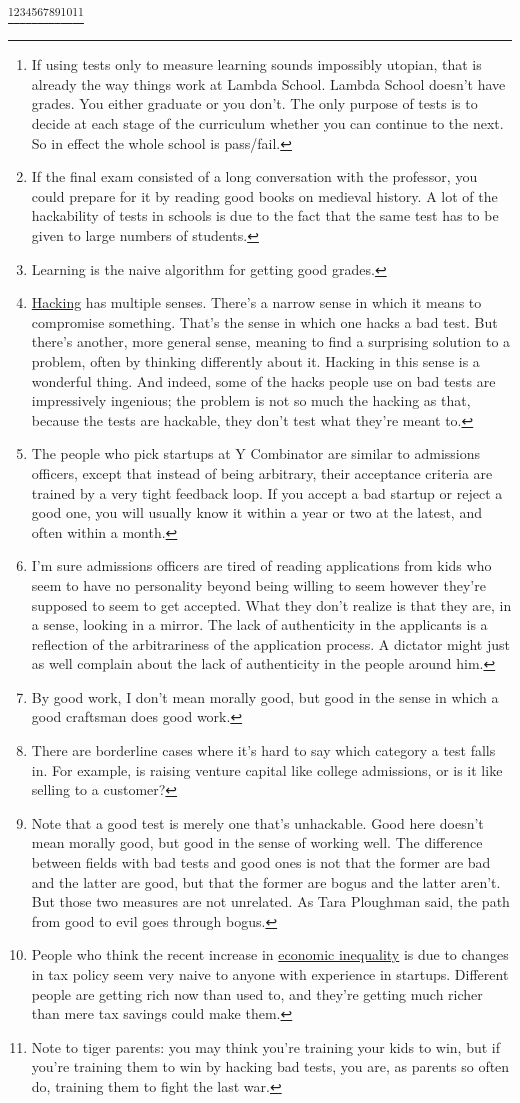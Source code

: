 \documentclass[12pt]{book}
\begin{document}
\footnote{If using tests only to measure learning sounds impossibly
utopian, that is already the way things work at Lambda School. Lambda
School doesn't have grades. You either graduate or you don't. The only
purpose of tests is to decide at each stage of the curriculum whether
you can continue to the next. So in effect the whole school is
pass/fail.}\footnote{If the final exam consisted of a long conversation with the
professor, you could prepare for it by reading good books on medieval
history. A lot of the hackability of tests in schools is due to the fact
that the same test has to be given to large numbers of students.}\footnote{Learning is the naive algorithm for getting good grades.}\footnote{\href{gba.html}{Hacking} has multiple senses. There's a narrow
sense in which it means to compromise something. That's the sense in
which one hacks a bad test. But there's another, more general sense,
meaning to find a surprising solution to a problem, often by thinking
differently about it. Hacking in this sense is a wonderful thing. And
indeed, some of the hacks people use on bad tests are impressively
ingenious; the problem is not so much the hacking as that, because the
tests are hackable, they don't test what they're meant to.}\footnote{The people who pick startups at Y Combinator are similar to
admissions officers, except that instead of being arbitrary, their
acceptance criteria are trained by a very tight feedback loop. If you
accept a bad startup or reject a good one, you will usually know it
within a year or two at the latest, and often within a month.}\footnote{I'm sure admissions officers are tired of reading applications
from kids who seem to have no personality beyond being willing to seem
however they're supposed to seem to get accepted. What they don't
realize is that they are, in a sense, looking in a mirror. The lack of
authenticity in the applicants is a reflection of the arbitrariness of
the application process. A dictator might just as well complain about
the lack of authenticity in the people around him.}\footnote{By good work, I don't mean morally good, but good in the sense
in which a good craftsman does good work.}\footnote{There are borderline cases where it's hard to say which category
a test falls in. For example, is raising venture capital like college
admissions, or is it like selling to a customer?}\footnote{Note that a good test is merely one that's unhackable. Good here
doesn't mean morally good, but good in the sense of working well. The
difference between fields with bad tests and good ones is not that the
former are bad and the latter are good, but that the former are bogus
and the latter aren't. But those two measures are not unrelated. As Tara
Ploughman said, the path from good to evil goes through bogus.}\footnote{People who think the recent increase in
\href{ineq.html}{economic inequality} is due to changes in tax policy
seem very naive to anyone with experience in startups. Different people
are getting rich now than used to, and they're getting much richer than
mere tax savings could make them.}\footnote{Note to tiger parents: you may think you're training your kids
to win, but if you're training them to win by hacking bad tests, you
are, as parents so often do, training them to fight the last war.}
\end{document}
